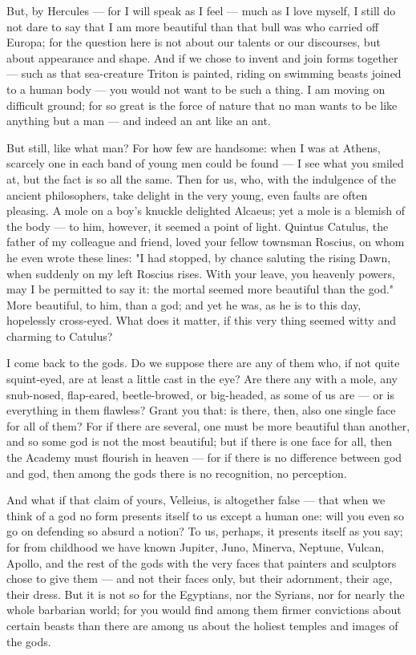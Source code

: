  But, by Hercules — for I will speak as I feel — much as I love myself, I still do not dare to say that I am more beautiful than that bull was who carried off Europa; for the question here is not about our talents or our discourses, but about appearance and shape. And if we chose to invent and join forms together — such as that sea-creature Triton is painted, riding on swimming beasts joined to a human body — you would not want to be such a thing. I am moving on difficult ground; for so great is the force of nature that no man wants to be like anything but a man — and indeed an ant like an ant.

 But still, like what man? For how few are handsome: when I was at Athens, scarcely one in each band of young men could be found — I see what you smiled at, but the fact is so all the same. Then for us, who, with the indulgence of the ancient philosophers, take delight in the very young, even faults are often pleasing. A mole on a boy's knuckle delighted Alcaeus; yet a mole is a blemish of the body — to him, however, it seemed a point of light. Quintus Catulus, the father of my colleague and friend, loved your fellow townsman Roscius, on whom he even wrote these lines: "I had stopped, by chance saluting the rising Dawn, when suddenly on my left Roscius rises. With your leave, you heavenly powers, may I be permitted to say it: the mortal seemed more beautiful than the god." More beautiful, to him, than a god; and yet he was, as he is to this day, hopelessly cross-eyed. What does it matter, if this very thing seemed witty and charming to Catulus?

 I come back to the gods. Do we suppose there are any of them who, if not quite squint-eyed, are at least a little cast in the eye? Are there any with a mole, any snub-nosed, flap-eared, beetle-browed, or big-headed, as some of us are — or is everything in them flawless? Grant you that: is there, then, also one single face for all of them? For if there are several, one must be more beautiful than another, and so some god is not the most beautiful; but if there is one face for all, then the Academy must flourish in heaven — for if there is no difference between god and god, then among the gods there is no recognition, no perception.

 And what if that claim of yours, Velleius, is altogether false — that when we think of a god no form presents itself to us except a human one: will you even so go on defending so absurd a notion? To us, perhaps, it presents itself as you say; for from childhood we have known Jupiter, Juno, Minerva, Neptune, Vulcan, Apollo, and the rest of the gods with the very faces that painters and sculptors chose to give them — and not their faces only, but their adornment, their age, their dress. But it is not so for the Egyptians, nor the Syrians, nor for nearly the whole barbarian world; for you would find among them firmer convictions about certain beasts than there are among us about the holiest temples and images of the gods.

